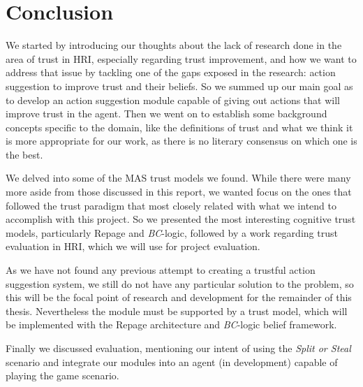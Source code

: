 \section{Conclusion}
\label{sec:Conclusion}
We started by introducing our thoughts about the lack of research done in the area of trust in \ac{HRI}, especially regarding trust improvement, and how we want to address that issue by tackling one of the gaps exposed in the research: action suggestion to improve trust and their beliefs. So we summed up our main goal as to develop an action suggestion module capable of giving out actions that will improve trust in the agent. Then we went on to establish some background concepts specific to the domain, like the definitions of trust and what we think it is more appropriate for our work, as there is no literary consensus on which one is the best. 

We delved into some of the \ac{MAS} trust models we found. While there were many more aside from those discussed in this report, we wanted focus on the ones that followed the trust paradigm that most closely related with what we intend to accomplish with this project. So we presented the most interesting cognitive trust models, particularly Repage and \textit{BC}-logic, followed by a work regarding trust evaluation in \ac{HRI}, which we will use for project evaluation.

As we have not found any previous attempt to creating a trustful action suggestion system, we still do not have any particular solution to the problem, so this will be the focal point of research and development for the remainder of this thesis. Nevertheless the module must be supported by a trust model, which will be implemented with the Repage architecture and \textit{BC}-logic belief framework.

Finally we discussed evaluation, mentioning our intent of using the \textit{Split or Steal} scenario and integrate our modules into an agent (in development) capable of playing the game scenario.